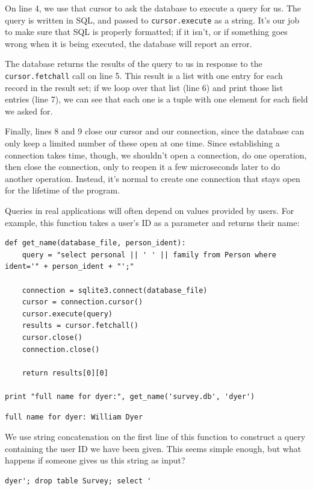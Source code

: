 \documentclass{book}
\begin{document}
On line 4, we use that cursor to ask the database to execute a query for
us. The query is written in SQL, and passed to \texttt{cursor.execute}
as a string. It's our job to make sure that SQL is properly formatted;
if it isn't, or if something goes wrong when it is being executed, the
database will report an error.

The database returns the results of the query to us in response to the
\texttt{cursor.fetchall} call on line 5. This result is a list with one
entry for each record in the result set; if we loop over that list (line
6) and print those list entries (line 7), we can see that each one is a
tuple with one element for each field we asked for.

Finally, lines 8 and 9 close our cursor and our connection, since the
database can only keep a limited number of these open at one time. Since
establishing a connection takes time, though, we shouldn't open a
connection, do one operation, then close the connection, only to reopen
it a few microseconds later to do another operation. Instead, it's
normal to create one connection that stays open for the lifetime of the
program.

Queries in real applications will often depend on values provided by
users. For example, this function takes a user's ID as a parameter and
returns their name:

\begin{verbatim}
def get_name(database_file, person_ident):
    query = "select personal || ' ' || family from Person where ident='" + person_ident + "';"

    connection = sqlite3.connect(database_file)
    cursor = connection.cursor()
    cursor.execute(query)
    results = cursor.fetchall()
    cursor.close()
    connection.close()

    return results[0][0]

print "full name for dyer:", get_name('survey.db', 'dyer')
\end{verbatim}

\begin{verbatim}
full name for dyer: William Dyer
\end{verbatim}

We use string concatenation on the first line of this function to
construct a query containing the user ID we have been given. This seems
simple enough, but what happens if someone gives us this string as
input?

\begin{verbatim}
dyer'; drop table Survey; select '
\end{verbatim}
\end{document}
